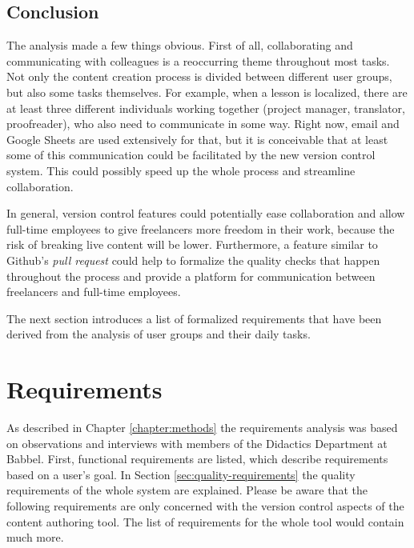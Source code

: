 \subsection{Conclusion}
The analysis made a few things obvious. First of all, collaborating and communicating with colleagues is a reoccurring theme throughout most tasks. Not only the content creation process is divided between different user groups, but also some tasks themselves. For example, when a lesson is localized, there are at least three different individuals working together (project manager, translator, proofreader), who also need to communicate in some way. Right now, email and Google Sheets are used extensively for that, but it is conceivable that at least some of this communication could be facilitated by the new version control system. This could possibly speed up the whole process and streamline collaboration.


In general, version control features could potentially ease collaboration and allow full-time employees to give freelancers more freedom in their work, because the risk of breaking live content will be lower. Furthermore, a feature similar to Github's \textit{pull request} could help to formalize the quality checks that happen throughout the process and provide a platform for communication between freelancers and full-time employees.

The next section introduces a list of formalized requirements that have been derived from the analysis of user groups and their daily tasks.

\section{Requirements}
As described in Chapter \ref{chapter:methods} the requirements analysis was based on observations and interviews with members of the Didactics Department at Babbel. First, functional requirements are listed, which describe requirements based on a user's goal. In Section \ref{sec:quality-requirements} the quality requirements of the whole system are explained. Please be aware that the following requirements are only concerned with the version control aspects of the content authoring tool. The list of requirements for the whole tool would contain much more.

